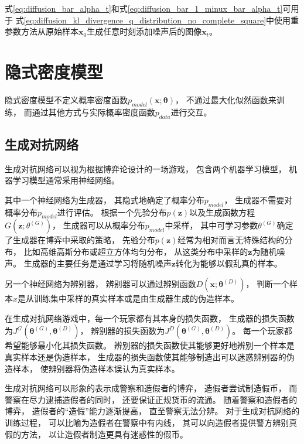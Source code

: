 式{\ref{eq:diffusion_bar_alpha_t}}和式{\ref{eq:diffusion_bar_1_minux_bar_alpha_t}}可用于
式{\ref{eq:diffusion_kl_divergence_q_distribution_no_complete_square}}中使用重参数方法从原始样本{$\bm{x}_{0}$}生成任意时刻添加噪声后的图像{$\bm{x}_{t}$}。








\section{隐式密度模型}\label{section:implicit_density_model}
隐式密度模型不定义概率密度函数{$p_{model}(\bm{x};\bm{\theta})$}，
不通过最大化似然函数来训练，
而通过其他方式与实际概率密度函数{$p_{data}$}进行交互。
\subsection{生成对抗网络}
生成对抗网络可以视为根据博弈论设计的一场游戏，
包含两个机器学习模型，
机器学习模型通常采用神经网络。

其中一个神经网络为生成器，
其隐式地确定了概率分布{$p_{model}$}，
生成器不需要对概率分布{$p_{model}$}进行评估。
根据一个先验分布{$p(\bm{z})$}以及生成函数方程{$G(\bm{z};\theta^{(G)})$}，
生成器可以从概率分布{$p_{model}$}中采样，
其中可学习参数{$\theta^{(G)}$}确定了生成器在博弈中采取的策略，
先验分布{$p(\bm{z})$}经常为相对而言无特殊结构的分布，
比如高维高斯分布或超立方体均匀分布，
从这类分布中采样的{$\bm{z}$}为随机噪声。
生成器的主要任务是通过学习将随机噪声{$\bm{z}$}转化为能够以假乱真的样本。

另一个神经网络为辨别器，
辨别器可以通过辨别函数{$D(\bm{x};\bm{\theta}^{(D)})$}，
判断一个样本{$x$}是从训练集中采样的真实样本或是由生成器生成的伪造样本。

在生成对抗网络游戏中，每一个玩家都有其本身的损失函数，
生成器的损失函数为{$J^{G}(\bm{\theta}^{(G)},\bm{\theta}^{(D)})$}，
辨别器的损失函数为{$J^{D}(\bm{\theta}^{(G)},\bm{\theta}^{(D)})$}。
每一个玩家都希望能够最小化其损失函数。
辨别器的损失函数使其能够更好地辨别一个样本是真实样本还是伪造样本，
生成器的损失函数使其能够制造出可以迷惑辨别器的伪造样本，
使辨别器将伪造样本误认为真实样本。


生成对抗网络可以形象的表示成警察和造假者的博弈，
造假者尝试制造假币，
而警察在尽力逮捕造假者的同时，
还要保证正规货币的流通。
随着警察和造假者的博弈，
造假者的“造假”能力逐渐提高，
直至警察无法分辨。
对于生成对抗网络的训练过程，
可以比喻为造假者在警察中有内线，
其可以向造假者提供警方辨别真假的方法，
以让造假者制造更具有迷惑性的假币。




